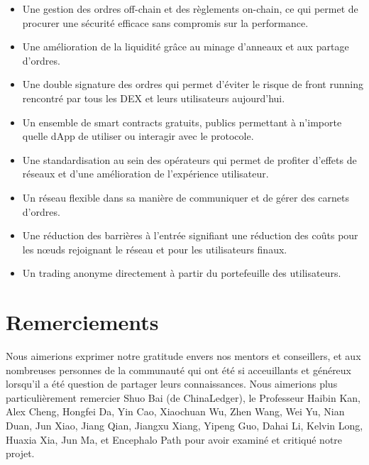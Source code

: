 \documentclass[UTF8,nofonts]{article}
\begin{document}
\begin{multicols}{2}
\begin{itemize}
	\item Une gestion des ordres off-chain et des règlements on-chain, ce qui permet de procurer une sécurité efficace sans compromis sur la performance.
	\item Une amélioration de la liquidité grâce au minage d'anneaux et aux partage d'ordres.
	\item Une double signature des ordres qui permet d'éviter le risque de front running rencontré par tous les DEX et leurs utilisateurs aujourd'hui.
	\item Un ensemble de smart contracts gratuits, publics permettant à n'importe quelle dApp de utiliser ou interagir avec le protocole.
	\item Une standardisation au sein des opérateurs qui permet de profiter d'effets de réseaux et d'une amélioration de l'expérience utilisateur.
	\item Un réseau flexible dans sa manière de communiquer et de gérer des carnets d'ordres.
	\item Une réduction des barrières à l'entrée signifiant une réduction des coûts pour les nœuds rejoignant le réseau et pour les utilisateurs finaux.
	\item Un trading anonyme directement à partir du portefeuille des utilisateurs.
\end{itemize}

\section{Remerciements}
Nous aimerions exprimer notre gratitude envers nos mentors et conseillers, et aux nombreuses personnes de la communauté qui ont été si acceuillants et généreux lorsqu'il a été question de partager leurs connaissances. Nous aimerions plus particulièrement remercier Shuo Bai (de ChinaLedger), le Professeur Haibin Kan, Alex Cheng, Hongfei Da, Yin Cao, Xiaochuan Wu, Zhen Wang, Wei Yu, Nian Duan, Jun Xiao, Jiang Qian, Jiangxu Xiang, Yipeng Guo, Dahai Li, Kelvin Long, Huaxia Xia, Jun Ma, et Encephalo Path pour avoir examiné et critiqué notre projet.  






\end{multicols}
\end{document}
